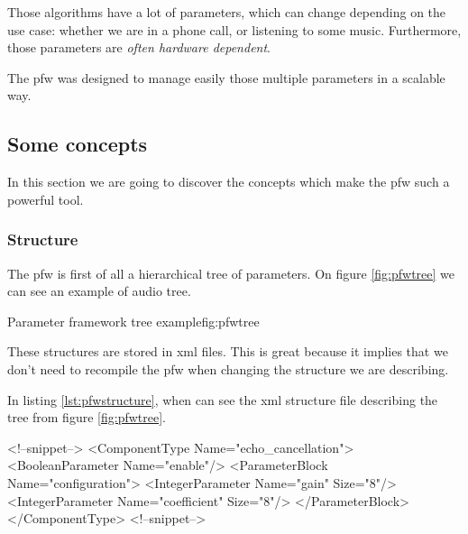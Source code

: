 Those algorithms have a lot of parameters, which can change depending on the use case: whether we are in a phone call,
or listening to some music. Furthermore, those parameters are \emph{often hardware dependent}.

The \gls{pfw} was designed to manage easily those multiple parameters in a scalable way.

\subsection{Some concepts}
In this section we are going to discover the concepts which make the
\gls{pfw} such a powerful tool.

\subsubsection{Structure}
The \gls{pfw} is first of all a hierarchical tree of parameters.
On figure \ref{fig:pfwtree} we can see an example of audio tree.

\begin{figureGraphics}{Parameter framework tree example}{fig:pfwtree}
\end{figureGraphics}

These structures are stored in \gls{xml} files. This is great because it implies that we don't need
to recompile the \gls{pfw} when changing the structure we are describing.

In listing \ref{lst:pfwstructure}, when can see the \gls{xml} structure file
describing the tree from figure \ref{fig:pfwtree}.

\begin{code}[language=pfwXml, caption=Structure file example snippet, label=lst:pfwstructure]
<!--snippet-->
<ComponentType Name="echo_cancellation">
    <BooleanParameter Name="enable"/>
    <ParameterBlock Name="configuration">
        <IntegerParameter Name="gain" Size="8"/>
        <IntegerParameter Name="coefficient" Size="8"/>
    </ParameterBlock>
</ComponentType>
<!--snippet-->
\end{code}

